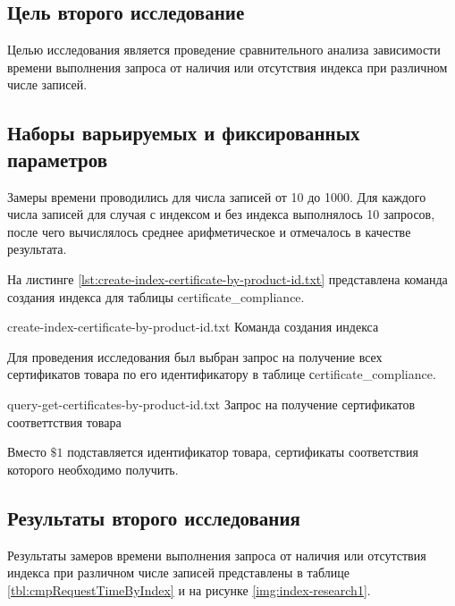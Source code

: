 \subsection{Цель второго исследование}

Целью исследования является проведение сравнительного анализа зависимости времени выполнения запроса от наличия или отсутствия индекса при различном числе записей.

\subsection{Наборы варьируемых и фиксированных параметров}

Замеры времени проводились для числа записей от 10 до 1000. Для каждого числа записей для случая с индексом и без индекса выполнялось 10 запросов, после чего вычислялось среднее арифметическое и отмечалось в качестве результата.

На листинге \ref{lst:create-index-certificate-by-product-id.txt} представлена команда создания индекса для таблицы certificate\_compliance.

{create-index-certificate-by-product-id.txt} %
{Команда создания индекса} %

\clearpage

Для проведения исследования был выбран запрос на получение всех сертификатов товара по его идентификатору в таблице сertificate\_compliance.

{query-get-certificates-by-product-id.txt} %
{Запрос на получение сертификатов соответтствия товара} %

Вместо $\$1$ подставляется идентификатор товара, сертификаты соответствия которого необходимо получить.

\subsection{Результаты второго исследования}

Результаты замеров времени выполнения запроса от наличия или отсутствия индекса при различном числе записей представлены в таблице \ref{tbl:cmpRequestTimeByIndex} и на рисунке \ref{img:index-research1}.


